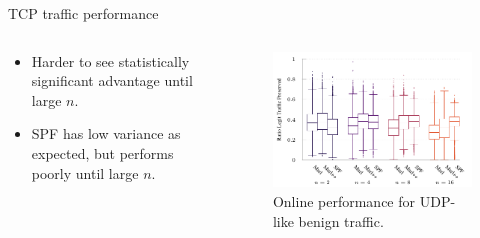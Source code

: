 \documentclass[aspectratio=169,xcolor={dvipsnames}
,hide notes
]{beamer}
\begin{document}
\begin{frame}{TCP traffic performance}
\begin{columns}
	\begin{column}{0.3\linewidth}
		\begin{itemize}
			\item Harder to see statistically significant advantage until large $n$.
			\item SPF has low variance as expected, but performs poorly until large $n$.
		\end{itemize}
	\end{column}
	\begin{column}{0.7\linewidth}
		\begin{figure}
			\centering
			\includegraphics[width=0.95\linewidth]{../plots/tcp-box}
			
			\caption{
				Online performance for UDP-like benign traffic.
				\label{fig:tcp-box}
			}
		\end{figure}
	\end{column}
\end{columns}
\end{frame}
\end{document}
